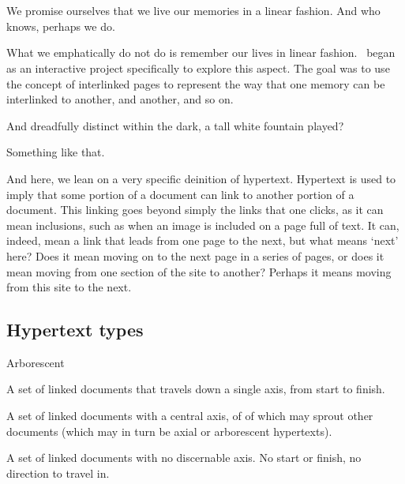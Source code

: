 \chapter*{\allyId}

\label{site}

\begin{paracol}{2}
\begin{leftcolumn}
We promise ourselves that we live our memories in a linear fashion. And who knows, perhaps we do.

What we emphatically do not do is remember our lives in linear fashion. \allyWord\ began as an interactive project specifically to explore this aspect. The goal was to use the concept of interlinked pages to represent the way that one memory can be interlinked to another, and another, and so on.

\begin{ally}
  And dreadfully distinct within the dark, a tall white fountain played?
\end{ally}
Something like that.

And here, we lean on a very specific deinition of hypertext. Hypertext is used to imply that some portion of a document can link to another portion of a document. This linking goes beyond simply the links that one clicks, as it can mean inclusions, such as when an image is included on a page full of text. It can, indeed, mean a link that leads from one page to the next, but what means `next' here? Does it mean moving on to the next page in a series of pages, or does it mean moving from one section of the site to another? Perhaps it means moving from this site to the next.

\end{leftcolumn}
\begin{rightcolumn*}
\newpage
\section*{Hypertext types}
\begin{labeling}{Arborescent}
  \item[Axial] A set of linked documents that travels down a single axis, from start to finish.
  \item[Arborescent] A set of linked documents with a central axis, of of which may sprout other documents (which may in turn be axial or arborescent hypertexts).
  \item[Networked] A set of linked documents with no discernable axis. No start or finish, no direction to travel in.
\end{labeling}
\end{rightcolumn*}
\begin{leftcolumn}


\end{leftcolumn}
\end{paracol}
